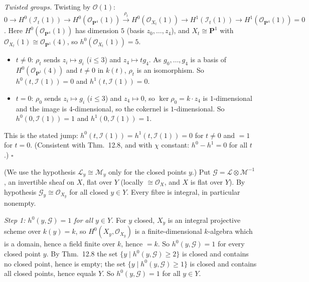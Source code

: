 \documentclass[11pt]{article}
\begin{document}
\emph{Twisted groups.} Twisting by $\mathcal O(1)$: $0\to H^0(\mathcal I_t(1))\to H^0(\mathcal O_{\mathbf P^4}(1))\xrightarrow{\ \rho_t\ }H^0(\mathcal O_{X_t}(1))\to H^1(\mathcal I_t(1))\to H^1(\mathcal O_{\mathbf P^4}(1))=0$. Here $H^0(\mathcal O_{\mathbf P^4}(1))$ has dimension $5$ (basis $z_0,\dots,z_4$), and $X_t\cong\mathbf P^1$ with $\mathcal O_{X_t}(1)\cong\mathcal O_{\mathbf P^1}(4)$, so $h^0(\mathcal O_{X_t}(1))=5$.
\begin{itemize}
\item $t\ne0$: $\rho_t$ sends $z_i\mapsto g_i$ ($i\le3$) and $z_4\mapsto tg_4$. As $g_0,\dots,g_4$ is a basis of $H^0(\mathcal O_{\mathbf P^1}(4))$ and $t\neq0$ in $k(t)$, $\rho_t$ is an isomorphism. So $h^0(t,\mathcal I(1))=0$ and $h^1(t,\mathcal I(1))=0$.
\item $t=0$: $\rho_0$ sends $z_i\mapsto g_i$ ($i\le3$) and $z_4\mapsto0$, so $\ker\rho_0=k\cdot z_4$ is $1$-dimensional and the image is $4$-dimensional, so the cokernel is $1$-dimensional. So $h^0(0,\mathcal I(1))=1$ and $h^1(0,\mathcal I(1))=1$.
\end{itemize}
This is the stated jump: $h^0(t,\mathcal I(1))=h^1(t,\mathcal I(1))=0$ for $t\ne0$ and $=1$ for $t=0$. (Consistent with Thm.~12.8, and with $\chi$ constant: $h^0-h^1=0$ for all $t$.) \hfill$\square$

\pf
(We use the hypothesis $\mathcal L_y\cong\mathcal M_y$ only for the closed points $y$.) Put $\mathcal G=\mathcal L\otimes\mathcal M^{-1}$, an invertible sheaf on $X$, flat over $Y$ (locally $\cong\mathcal O_X$, and $X$ is flat over $Y$). By hypothesis $\mathcal G_y\cong\mathcal O_{X_y}$ for all closed $y\in Y$. Every fibre is integral, in particular nonempty.

\emph{Step 1: $h^0(y,\mathcal G)=1$ for all $y\in Y$.} For $y$ closed, $X_y$ is an integral projective scheme over $k(y)=k$, so $H^0(X_y,\mathcal O_{X_y})$ is a finite-dimensional $k$-algebra which is a domain, hence a field finite over $k$, hence $=k$. So $h^0(y,\mathcal G)=1$ for every closed point $y$. By Thm.~12.8 the set $\{y\mid h^0(y,\mathcal G)\ge2\}$ is closed and contains no closed point, hence is empty; the set $\{y\mid h^0(y,\mathcal G)\ge1\}$ is closed and contains all closed points, hence equals $Y$. So $h^0(y,\mathcal G)=1$ for all $y\in Y$.
\end{document}
